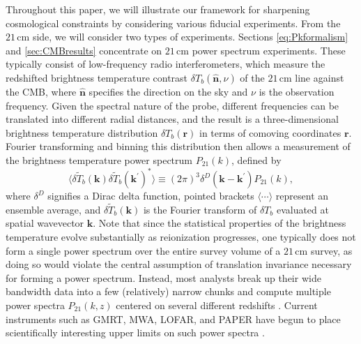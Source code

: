 \documentclass[twocolumn,aps,prd,nofootinbib,showpacs,superscriptaddress]{revtex4-1}
\begin{document}
Throughout this paper, we will illustrate our framework for sharpening cosmological constraints by considering various fiducial experiments. From the $21\,\textrm{cm}$ side, we will consider two types of experiments. Sections \ref{eq:Pkformalism} and \ref{sec:CMBresults} concentrate on $21\,\textrm{cm}$ power spectrum experiments. These typically consist of low-frequency radio interferometers, which measure the redshifted brightness temperature contrast $\delta T_b (\mathbf{\hat{n}}, \nu)$ of the $21\,\textrm{cm}$ line against the CMB, where $\mathbf{\hat{n}}$ specifies the direction on the sky and $\nu$ is the observation frequency. Given the spectral nature of the probe, different frequencies can be translated into different radial distances, and the result is a three-dimensional brightness temperature distribution $\delta T_b (\mathbf{r})$ in terms of comoving coordinates $\mathbf{r}$. Fourier transforming and binning this distribution then allows a measurement of the brightness temperature power spectrum $P_\textrm{21} (k)$, defined by
\begin{equation}
\label{eq:PspecDef}
\langle \delta \widetilde{T}_b(\mathbf{k}) \delta \widetilde{T}_b(\mathbf{k}^\prime)^* \rangle \equiv (2\pi)^3 \delta^D (\mathbf{k} - \mathbf{k}^\prime ) P_\textrm{21} (k),
\end{equation}
where $\delta^D$ signifies a Dirac delta function, pointed brackets $\langle \cdots \rangle$ represent an ensemble average, and $ \delta \widetilde{T}_b(\mathbf{k})$ is the Fourier transform of  $\delta T_b$ evaluated at spatial wavevector $\mathbf{k}$. Note that since the statistical properties of the brightness temperature evolve substantially as reionization progresses, one typically does not form a single power spectrum over the entire survey volume of a $21\,\textrm{cm}$ survey, as doing so would violate the central assumption of translation invariance necessary for forming a power spectrum. Instead, most analysts break up their wide bandwidth data into a few (relatively) narrow chunks and compute multiple power spectra $P_\textrm{21} (k,z)$ centered on several different redshifts \cite{Liu_in_prep}. Current instruments such as GMRT, MWA, LOFAR, and PAPER have begun to place scientifically interesting upper limits on such power spectra \cite{parsons_et_al2014,ali_et_al2015,pober_et_al2015,greig_et_al2015a}.
\end{document}
